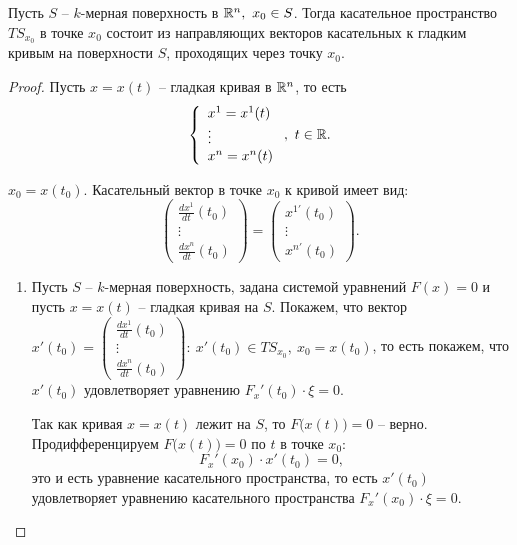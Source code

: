 \begin{theorem}\label{theorem:2}
    Пусть $S$ -- $k$-мерная поверхность в $\mathbb{R}^n, \ x_0 \in S$. Тогда касательное пространство $TS_{x_0}$ в точке $x_0$ состоит из направляющих векторов касательных к гладким кривым на поверхности $S$, проходящих через точку $x_0$.
\end{theorem}

\begin{proof}
    Пусть $x = x(t)$ -- гладкая кривая в $\mathbb{R}^n$, то есть
    \[
        \left\{\begin{array}{l}
            x^1 = x^1(t) \\
            \vdots       \\
            x^n = x^n(t)
        \end{array}\right., \ t \in \mathbb{R}.
    \]

    $ x_0 = x(t_0) $. Касательный вектор в точке $x_0$ к кривой имеет вид:
    \[
        \left(\begin{matrix}
                \frac{dx^1}{dt}(t_0) \\
                \vdots               \\
                \frac{dx^n}{dt}(t_0)
            \end{matrix}\right) = \left(\begin{matrix}
                x^{1'}(t_0) \\
                \vdots      \\
                x^{n'}(t_0)
            \end{matrix}\right).
    \]
    \begin{enumerate}
        \item Пусть $S$ -- $k$-мерная поверхность, задана системой уравнений $F(x) = 0$ и пусть $x = x(t)$ -- гладкая кривая на $S$. Покажем, что вектор $x'(t_0) = \left(\begin{matrix}
                          \frac{dx^1}{dt}(t_0) \\
                          \vdots               \\
                          \frac{dx^n}{dt}(t_0)
                      \end{matrix}\right): \ x'(t_0) \in TS_{x_0}, \ x_0 = x(t_0)$, то есть покажем, что $x'(t_0)$ удовлетворяет уравнению $F_x'(t_0)\cdot \xi=0$.

              Так как кривая $x = x(t)$ лежит на $S$, то $F\big(x(t)\big) = 0$ -- верно. Продифференцируем $F\big(x(t)\big) = 0$ по $t$ в точке $x_0$:
              \[
                  F_x'(x_0) \cdot x'(t_0) = 0,
              \]
              это и есть уравнение касательного пространства, то есть $x'(t_0)$ удовлетворяет уравнению касательного пространства $F_x'(x_0)\cdot \xi = 0$.


\end{enumerate}
\end{proof}
